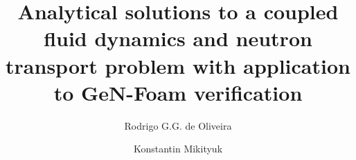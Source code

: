 

\title{Analytical solutions to a coupled fluid dynamics and neutron transport problem with application to GeN-Foam verification}

\author{Rodrigo G.G. de Oliveira}

\author{Konstantin Mikityuk}

\address{\'{E}cole polytechnique f\'{e}d\'{e}rale de Lausanne, 1015 Lausanne, Switzerland \\
         Paul Scherrer Institut, 5232 Villigen PSI, Switzerland}


